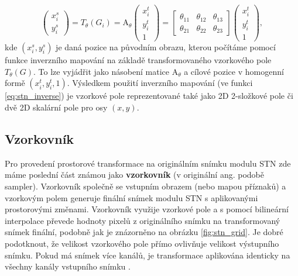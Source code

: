 \begin{equation}
\begin{pmatrix}
x_i^s \\
y_i^s
\end{pmatrix}
= T_{\theta}(G_i) = {\displaystyle \mathrm {A} }_\theta
\begin{pmatrix}
x_i^t \\
y_i^t \\
1
\end{pmatrix}
= 
\begin{bmatrix}
\theta_{11} & \theta_{12} & \theta_{13} \\
\theta_{21} & \theta_{22} & \theta_{23}
\end{bmatrix}
\begin{pmatrix}
x_i^t \\
y_i^t \\
1
\end{pmatrix},
\label{eq:stn_inverse}
\end{equation}
kde $(x_i^s, y_i^s)$ je daná pozice na původním obrazu, kterou počítáme pomocí funkce inverzního mapování na základě transformovaného vzorkového pole $T_{\theta}(G)$. To lze vyjádřit jako násobení matice ${\displaystyle \mathrm {A} }_\theta$ a cílové pozice v homogenní formě $(x_i^t, y_i^t, 1)$. Výsledkem použití inverzního mapování (ve funkci \ref{eq:stn_inverse}) je vzorkové pole reprezentované také jako 2D 2-složkové pole či dvě 2D skalární pole pro osy $(x, y)$.

\subsection{Vzorkovník}

Pro provedení prostorové transformace na originálním snímku modulu STN zde máme poslední část známou jako \textbf{vzorkovník} (v originální ang. podobě sampler). Vzorkovník společně se vstupním obrazem (nebo mapou příznaků) a vzorkovým polem generuje finální snímek modulu STN s aplikovanými prostorovými změnami. Vzorkovník využije vzorkové pole a s pomocí bilineární interpolace převede hodnoty pixelů z originálního snímku na transformovaný snímek finální, podobně jak je znázorněno na obrázku \ref{fig:stn_grid}. Je dobré podotknout, že velikost vzorkového pole přímo ovlivňuje velikost výstupního snímku. Pokud má snímek více kanálů, je transformace aplikována identicky na všechny kanály vstupního snímku \cite{stn_medium_3}.


